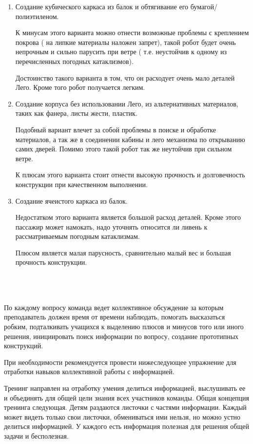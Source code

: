 \begin{enumerate}
	\item Создание кубического каркаса из балок и обтягивание его бумагой/полиэтиленом.
	
	К минусам этого варианта можно отнести возможные проблемы с креплением покрова ( на липкие материалы наложен запрет), такой робот будет очень непрочным и сильно парусить при ветре ( т.е. неустойчив к одному из перечисленных погодных катаклизмов).
	
	Достоинство такого варианта в том, что он расходует очень мало деталей Лего. Кроме того робот получается легким.
	
	\item Создание корпуса  без использовании Лего, из альтернативных материалов, таких как фанера, листы жести, пластик.
	
	Подобный вариант влечет за собой проблемы в  поиске и обработке материалов, а так же в соединении кабины и лего механизма по открыванию самих дверей. Помимо этого такой робот так же неутойчив при сильном ветре.
	
	К плюсам этого варианта стоит отнести высокую прочность и долговечность конструкции при качественном выполнении. 
	
	\item Создание ячеистого каркаса из балок.
	
	Недостатком этого варианта является большой расход деталей. Кроме этого пассажир может намокать, надо уточнять относится ли ливень к рассматриваемым погодным катаклизмам.
	
	Плюсом является малая парусность, сравнительно малый вес и большая прочность конструкции.\\\\	
\end{enumerate}

{\hypertarget{lesson25x3}{}}\\\\	

По каждому вопросу  команда ведет коллективное обсуждение за которым преподаватель должен время от времени наблюдать, помогать высказаться робким, подталкивать учащихся к выделению плюсов и минусов того или иного решения, инициировать поиск информации по вопросу, создание прототипных конструкций. 

При необходимости рекомендуется провести нижеследующее упражнение для отработки навыков коллективной работы с информацией.

Тренинг направлен на отработку умения делиться информацией, выслушивать ее и объединять для общей цели знания всех участников команды. Общая концепция тренинга следующая.  Детям раздаются листочки с частями информации. Каждый может видеть только свои листочки, обмениваться ими нельзя, но можно устно делиться информацией. У каждого есть информация полезная для решения общей задачи и бесполезная. 

